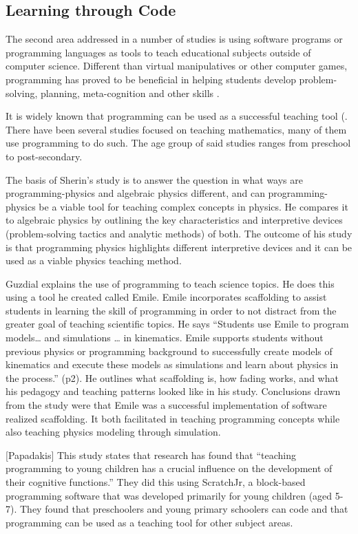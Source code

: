 \documentclass[12pt]{extarticle}
\begin{document}
\subsection*{Learning through Code}
The second area addressed in a number of studies is using software programs or programming languages as tools to teach educational subjects outside of computer science. Different than virtual manipulatives or other computer games, programming has proved to be beneficial in helping students develop problem-solving, planning, meta-cognition and other skills \cite{papadakis, fuchs}.   

It is widely known that programming can be used as a successful teaching tool (. There have been several studies focused on teaching mathematics, many of them use programming to do such. The age group of said studies ranges from preschool to post-secondary. 

The basis of Sherin’s study is to answer the question in what ways are programming-physics and algebraic physics different, and can programming-physics be a viable tool for teaching complex concepts in physics. He compares it to algebraic physics by outlining the key characteristics and interpretive devices (problem-solving tactics and analytic methods) of both. The outcome of his study is that programming physics highlights different interpretive devices and it can be used as a viable physics teaching method.

Guzdial explains the use of programming to teach science topics. He does this using a tool he created called Emile. Emile incorporates scaffolding to assist students in learning the skill of programming in order to not distract from the greater goal of teaching scientific topics. He says “Students use Emile to program models… and simulations … in kinematics. Emile supports students without previous physics or programming background to successfully create models of kinematics and execute these models as simulations and learn about physics in the process.” (p2). He outlines what scaffolding is, how fading works, and what his pedagogy and teaching patterns looked like in his study. Conclusions drawn from the study were that Emile was a successful implementation of software realized scaffolding. It both facilitated in teaching programming concepts while also teaching physics modeling through simulation.

[Papadakis] This study states that research has found that “teaching programming to young children has a crucial influence on the development of their cognitive functions.” They did this using ScratchJr, a block-based programming software that was developed primarily for young children (aged 5-7). They found that preschoolers and young primary schoolers can code and that programming can be used as a teaching tool for other subject areas.
\end{document}
